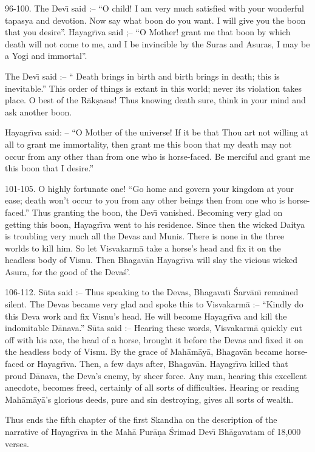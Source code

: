 96-100. The Dev\={\i} said :-- ``O child! I am very much satisfied with your wonderful tapasya and devotion. Now say what boon do you want. I will give you the boon that you desire''. Hayagr\={\i}va said ;-- ``O Mother! grant me that boon by which death will not come to me, and I be invincible by the Suras and Asuras, I may be a Yogi and immortal''.

The Dev\={\i} said :-- `` Death brings in birth and birth brings in death; this is inevitable.'' This order of things is extant in this world; never its violation takes place. O best of the R\=ak\d{s}asas! Thus knowing death sure, think in your mind and ask another boon.

Hayagr\={\i}va said: -- ``O Mother of the universe! If it be that Thou art not willing at all to grant me immortality, then grant me this boon that my death may not occur from any other than from one who is horse-faced. Be merciful and grant me this boon that I desire.''

101-105. O highly fortunate one! ``Go home and govern your kingdom at your ease; death won't occur to you from any other beings then from one who is horse-faced.'' Thus granting the boon, the Dev\={\i} vanished. Becoming very glad on getting this boon, Hayagr\={\i}va went to his residence. Since then the wicked Daitya is troubling very much all the Devas and Munis. There is none in the three worlds to kill him. So let Visvakarm\=a take a horse's head and fix it on the headless body of Visnu. Then Bhagav\=an Hayagr\={\i}va will slay the vicious wicked Asura, for the good of the Deva\'s'.

106-112. S\=uta said :-- Thus speaking to the Devas, Bhagavat\={\i} \'Sarv\=an\={\i} remained silent. The Devas became very glad and spoke this to Visvakarm\=a :-- ``Kindly do this Deva work and fix Visnu's head. He will become Hayagr\={\i}va and kill the indomitable D\=anava.'' S\=uta said :-- Hearing these words, Visvakarm\=a quickly cut off with his axe, the head of a horse, brought it before the Devas and fixed it on the headless body of Visnu. By the grace of Mah\=am\=ay\=a, Bhagav\=an became horse-faced or Hayagr\={\i}va. Then, a few days after, Bhagav\=an. Hayagr\={\i}va killed that proud D\=anava, the Deva's enemy, by sheer force. Any man, hearing this excellent anecdote, becomes freed, certainly of all sorts of difficulties. Hearing or reading Mah\=am\=ay\=a's glorious deeds, pure and sin destroying, gives all sorts of wealth.

Thus ends the fifth chapter of the first Skandha on the description of the narrative of Hayagr\={\i}va in the Mah\=a Pur\=a\d{n}a \'Srimad Dev\={\i} Bh\=agavatam of 18,000 verses.



